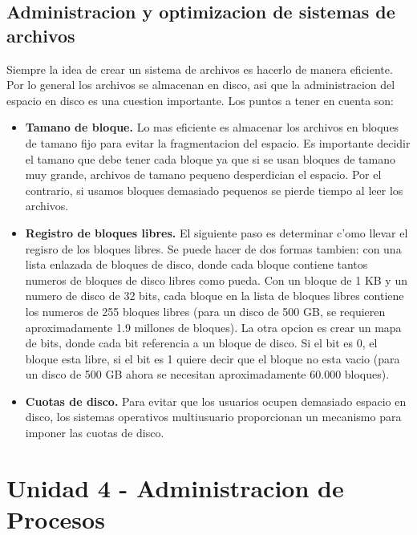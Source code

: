 \documentclass[12pt]{article}
\begin{document}
  \subsection{Administracion y optimizacion de sistemas de archivos}
  Siempre la idea de crear un sistema de archivos es hacerlo de manera eficiente. Por lo general los archivos se almacenan en disco, asi que la administracion del espacio en disco es una cuestion importante. Los puntos a tener en cuenta son:
  \begin{itemize}
    \item \textbf{Tamano de bloque.} Lo mas eficiente es almacenar los archivos en bloques de tamano fijo para evitar la fragmentacion del espacio. Es importante decidir el tamano que debe tener cada bloque ya que si se usan bloques de tamano muy grande, archivos de tamano pequeno desperdician el espacio. Por el contrario, si usamos bloques demasiado pequenos se pierde tiempo al leer los archivos.

    \item \textbf{Registro de bloques libres.} El siguiente paso es determinar c'omo llevar el regisro de los bloques libres. Se puede hacer de dos formas tambien: con una lista enlazada de bloques de disco, donde cada bloque contiene tantos numeros de bloques de disco libres como pueda. Con un bloque de 1 KB y un numero de disco de 32 bits, cada bloque en la lista de bloques libres contiene los numeros de 255 bloques libres (para un disco de 500 GB, se requieren aproximadamente 1.9 millones de bloques). La otra opcion es crear un mapa de bits, donde cada bit referencia a un bloque de disco. Si el bit es 0, el bloque esta libre, si el bit es 1 quiere decir que el bloque no esta vacio (para un disco de 500 GB ahora se necesitan aproximadamente 60.000 bloques).

    \item \textbf{Cuotas de disco.} Para evitar que los usuarios ocupen demasiado espacio en disco, los sistemas operativos multiusuario proporcionan un mecanismo para imponer las cuotas de disco.
  \end{itemize}

  \section{Unidad 4 - Administracion de Procesos}

  


  

  \newpage
  \printbibliography
\end{document}
